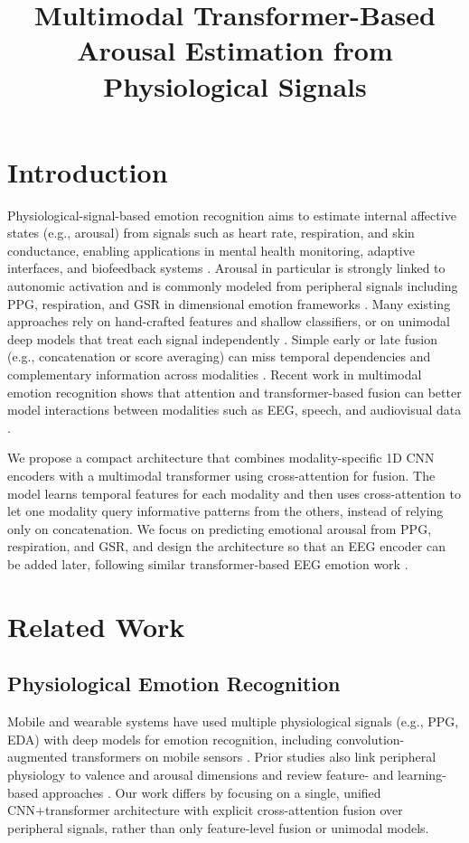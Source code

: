 \documentclass[11pt]{article}
\title{Multimodal Transformer-Based Arousal Estimation from Physiological Signals}
\author{}
\date{}
\begin{document}
\maketitle
\onehalfspacing

\section{Introduction}
Physiological-signal-based emotion recognition aims to estimate internal affective states (e.g., arousal) from signals such as heart rate, respiration, and skin conductance, enabling applications in mental health monitoring, adaptive interfaces, and biofeedback systems \cite{kacimi_comprehensive_2025,wu_comprehensive_2025}. Arousal in particular is strongly linked to autonomic activation and is commonly modeled from peripheral signals including PPG, respiration, and GSR in dimensional emotion frameworks \cite{kacimi_comprehensive_2025,sato_physiological_2020}. Many existing approaches rely on hand-crafted features and shallow classifiers, or on unimodal deep models that treat each signal independently \cite{kacimi_comprehensive_2025,siddiqui_respiration_2021}. Simple early or late fusion (e.g., concatenation or score averaging) can miss temporal dependencies and complementary information across modalities \cite{wu_comprehensive_2025,abdurahmon_general_2025}. Recent work in multimodal emotion recognition shows that attention and transformer-based fusion can better model interactions between modalities such as EEG, speech, and audiovisual data \cite{alam_tmnet_2025,huo_cemtnet_2026,ahire_maven_2025}.

We propose a compact architecture that combines modality-specific 1D CNN encoders with a multimodal transformer using cross-attention for fusion. The model learns temporal features for each modality and then uses cross-attention to let one modality query informative patterns from the others, instead of relying only on concatenation. We focus on predicting emotional arousal from PPG, respiration, and GSR, and design the architecture so that an EEG encoder can be added later, following similar transformer-based EEG emotion work \cite{li_spatial_2025,abgeena_unravelling_2025}.

\section{Related Work}
\subsection{Physiological Emotion Recognition}
Mobile and wearable systems have used multiple physiological signals (e.g., PPG, EDA) with deep models for emotion recognition, including convolution-augmented transformers on mobile sensors \cite{yang_mobile_2022}. Prior studies also link peripheral physiology to valence and arousal dimensions and review feature- and learning-based approaches \cite{sato_physiological_2020,kacimi_comprehensive_2025}. Our work differs by focusing on a single, unified CNN+transformer architecture with explicit cross-attention fusion over peripheral signals, rather than only feature-level fusion or unimodal models.
\end{document}
